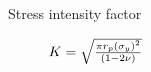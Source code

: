 \documentclass[aspectratio=169,xcolor=dvipsnames]{beamer}
\begin{document}
\begin{frame}{Stress intensity factor}
\begin{figure}
\begin{minipage}{0.6\linewidth}
\begin{minipage}{0.5\linewidth}
		\end{minipage}\hfill
			\begin{minipage}{0.5\linewidth}
		\fontsize{5pt}{4pt}\selectfont{
			\def\svgwidth{\linewidth}
			}
	\end{minipage}\hfill
		\centering
		\begin{center}
		\tiny{$K={\sqrt{\pi r_p\left(\sigma_y\right)^2\over (1-2\nu)}}$}
	\end{center}
	\hspace{0.18\linewidth} \hfill
	\fontsize{5pt}{4pt}\hfill
\end{minipage}
\end{figure}
\end{frame}
\end{document}

